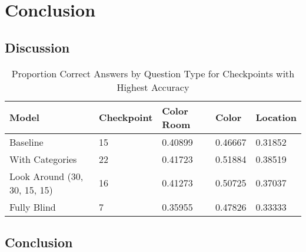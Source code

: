 \chapter{Conclusion}
\section{Discussion}
\begin{table}[H]
\centering
\caption{Proportion Correct Answers by Question Type for Checkpoints with Highest Accuracy}
\begin{tabular}{l | l | l | l | l}
Model & Checkpoint & Color Room & Color & Location \\
\hline
Baseline & 15 & 0.40899 & 0.46667 & 0.31852 \\
With Categories & 22 & 0.41723 & 0.51884 & 0.38519 \\
Look Around (30, 30, 15, 15) & 16 & 0.41273 & 0.50725 & 0.37037 \\
Fully Blind & 7 & 0.35955 & 0.47826 & 0.33333 \\
\end{tabular}
\label{tab:correct_answers}
\end{table}

\section{Conclusion}
